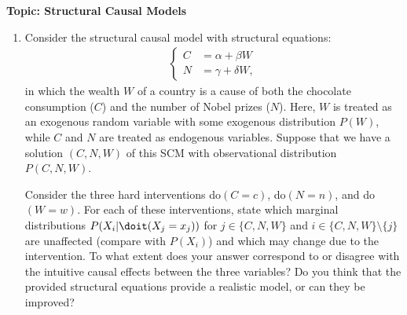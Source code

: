 

\flushleft\textbf{Topic: Structural Causal Models}

\begin{enumerate}
  \item %
  Consider the structural causal model with structural equations:
  \begin{align*}
    \begin{cases}
      C & = \alpha + \beta W   \\
      N & = \gamma + \delta W,
    \end{cases}
  \end{align*}
  in which the wealth $W$ of a country is a cause of both the chocolate consumption ($C$) and the number of Nobel prizes ($N$).
  Here, $W$ is treated as an exogenous random variable with some exogenous distribution $P(W)$, while $C$ and $N$ are treated as endogenous variables. Suppose that we have a solution $(C, N, W)$ of this SCM with observational distribution $P(C, N, W)$.


  Consider the three hard interventions do$(C = c)$, do$(N = n)$, and do$(W = w)$. For each of these interventions, state which marginal distributions $P(X_i |\doit(X_j=x_j))$ for $j \in \{C, N, W\}$ and $i\in \{C, N, W\}\setminus \{j\}$ are unaffected (compare with $P(X_i)$) and which may change due to the intervention. To what extent does your answer correspond to or disagree with the intuitive causal effects between the three variables? Do you think that the provided structural equations provide a realistic model, or can they be improved?


\end{enumerate}
